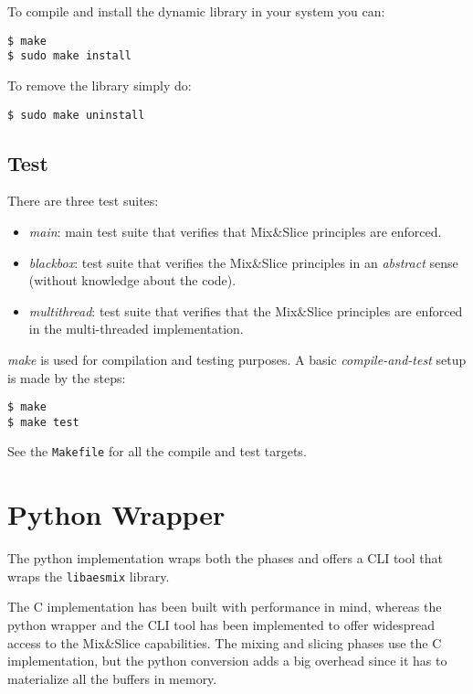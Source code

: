 To compile and install the dynamic library in your system you can:

\begin{verbatim}
$ make
$ sudo make install
\end{verbatim}

To remove the library simply do:

\begin{verbatim}
$ sudo make uninstall
\end{verbatim}

\subsection{Test}\label{test}

There are three test suites:

\begin{itemize}
\item
  \emph{main}: main test suite that verifies that Mix\&Slice principles
  are enforced.
\item
  \emph{blackbox}: test suite that verifies the Mix\&Slice principles in
  an \emph{abstract} sense (without knowledge about the code).
\item
  \emph{multithread}: test suite that verifies that the Mix\&Slice
  principles are enforced in the multi-threaded implementation.
\end{itemize}

\emph{make} is used for compilation and testing purposes. A basic
\emph{compile-and-test} setup is made by the steps:

\begin{verbatim}
$ make
$ make test
\end{verbatim}

See the \texttt{Makefile} for all the compile and test targets.


\section{Python Wrapper}\label{aesmix-python}

The python implementation
wraps both the phases and offers a CLI tool that wraps the
\texttt{libaesmix} library.

The C implementation has been built with performance in mind, whereas
the python wrapper and the CLI tool has been implemented to offer
widespread access to the Mix\&Slice capabilities. The mixing and slicing
phases use the C implementation, but the python conversion adds a big
overhead since it has to materialize all the buffers in memory.

